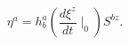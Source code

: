 \begin{equation}
\eta ^{a}=h_{b}^{a}(\frac{d\xi ^{z}}{dt}\mid _{0})S^{bz}.  \label{58}
\end{equation}


